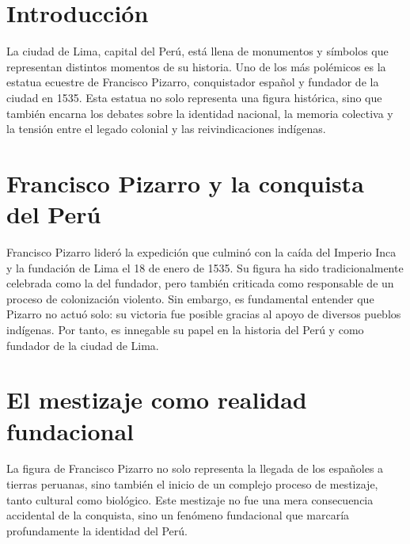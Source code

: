 \documentclass[a4paper,12pt]{article}
\begin{document}
	

	\tableofcontents
	
	\listoftables
	
	
	\listoffigures

	\newpage
	
	
	\section{Introducción}
	
	La ciudad de Lima, capital del Perú, está llena de monumentos y símbolos que representan distintos momentos de su historia. Uno de los más polémicos es la estatua ecuestre de Francisco Pizarro, conquistador español y fundador de la ciudad en 1535. Esta estatua no solo representa una figura histórica, sino que también encarna los debates sobre la identidad nacional, la memoria colectiva y la tensión entre el legado colonial y las reivindicaciones indígenas.
	
	\section{Francisco Pizarro y la conquista del Perú}
	
	Francisco Pizarro lideró la expedición que culminó con la caída del Imperio Inca y la fundación de Lima el 18 de enero de 1535. Su figura ha sido tradicionalmente celebrada como la del fundador, pero también criticada como responsable de un proceso de colonización violento. Sin embargo, es fundamental entender que Pizarro no actuó solo: su victoria fue posible gracias al apoyo de diversos pueblos indígenas. Por tanto, es innegable su papel en la historia del Perú y como fundador de la ciudad de Lima.
	
	\section{El mestizaje como realidad fundacional}
	
	La figura de Francisco Pizarro no solo representa la llegada de los españoles a tierras peruanas, sino también el inicio de un complejo proceso de mestizaje, tanto cultural como biológico. Este mestizaje no fue una mera consecuencia accidental de la conquista, sino un fenómeno fundacional que marcaría profundamente la identidad del Perú.
	
\end{document}

